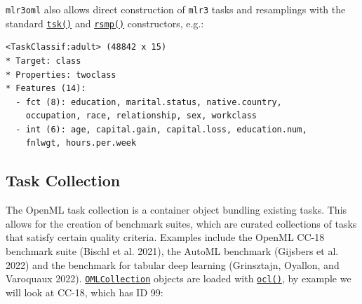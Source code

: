 \texttt{mlr3oml} also allows direct construction of \texttt{mlr3} tasks
and resamplings with the standard
\href{https://mlr3.mlr-org.com/reference/mlr_sugar.html}{\texttt{tsk()}}
and
\href{https://mlr3.mlr-org.com/reference/mlr_sugar.html}{\texttt{rsmp()}}
constructors, e.g.:

\begin{Shaded}
\begin{Highlighting}[]
\NormalTok{(}\NormalTok{, } \NormalTok{)}
\end{Highlighting}
\end{Shaded}

\begin{verbatim}
<TaskClassif:adult> (48842 x 15)
* Target: class
* Properties: twoclass
* Features (14):
  - fct (8): education, marital.status, native.country,
    occupation, race, relationship, sex, workclass
  - int (6): age, capital.gain, capital.loss, education.num,
    fnlwgt, hours.per.week
\end{verbatim}

\hypertarget{sec-openml-collection}{%
\subsection{Task Collection}\label{sec-openml-collection}}

The OpenML task collection is a container object bundling existing
tasks. This allows for the creation of benchmark
suites, which are curated collections of tasks
that satisfy certain quality criteria. Examples include the OpenML CC-18
benchmark suite (Bischl et al. 2021), the AutoML benchmark (Gijsbers et
al. 2022) and the benchmark for tabular deep learning (Grinsztajn,
Oyallon, and Varoquaux 2022).
\href{https://mlr3oml.mlr-org.com/reference/oml_collection.html}{\texttt{OMLCollection}}
objects are loaded with
\href{https://mlr3oml.mlr-org.com/reference/oml_sugar.html}{\texttt{ocl()}},
by example we will look at CC-18, which has ID 99:

\begin{Shaded}
\begin{Highlighting}[]
\OtherTok{=} \NormalTok{(} \NormalTok{)}
\end{Highlighting}
\end{Shaded}


